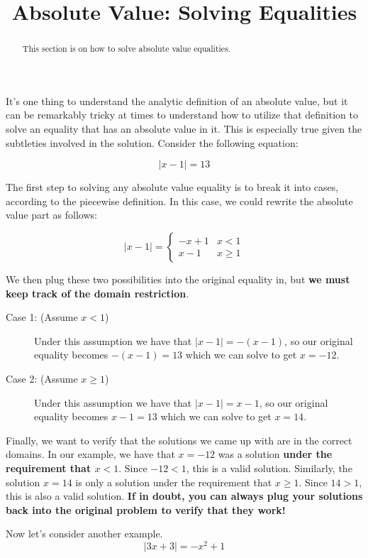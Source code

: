 \documentclass{ximeraXloud}
\title{Absolute Value: Solving Equalities}
\begin{document}
\begin{abstract}
    This section is on how to solve absolute value equalities.
\end{abstract}
\maketitle

It's one thing to understand the analytic definition of an absolute value, but it can be remarkably tricky at times to understand how to utilize that definition to solve an equality that has an absolute value in it. This is especially true given the subtleties involved in the solution. Consider the following equation:

\[
    |x-1| = 13
\]

The first step to solving any absolute value equality is to break it into cases, according to the piecewise definition. In this case, we could rewrite the absolute value part as follows:

\[
    |x-1| = 
        \begin{cases}
            -x + 1 & x < 1 \\
            x - 1 & x \geq 1
        \end{cases}
\]

We then plug these two possibilities into the original equality in, but \textbf{we must keep track of the domain restriction}. 
\begin{description}
    \item[Case 1: (Assume $x < 1$)] Under this assumption we have that \hbox{$|x-1| = -(x-1)$}, so our original equality becomes $-(x-1) = 13$ which we can solve to get $x = -12$.
    \item[Case 2: (Assume $x \geq 1$)] Under this assumption we have that $|x-1| = x-1$, so our original equality becomes $x-1 = 13$ which we can solve to get $x = 14$.
\end{description}
Finally, we want to verify that the solutions we came up with are in the correct domains. In our example, we have that $x = -12$ was a solution \textbf{under the requirement that $x < 1$}. Since $-12 < 1$, this is a valid solution. Similarly, the solution $x = 14$ is only a solution under the requirement that $x \geq 1$. Since $14 > 1$, this is also a valid solution. \textbf{If in doubt, you can always plug your solutions back into the original problem to verify that they work!}

Now let's consider another example.
\[
    |3x + 3| = -x^2 + 1
\]
\end{document}
